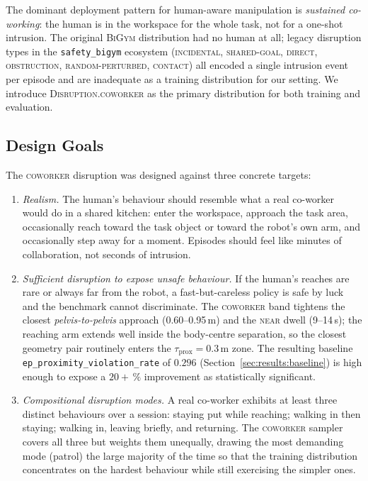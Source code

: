 \documentclass[11pt,a4paper]{report}
\newcommand{\bigym}{\textsc{BiGym}}
\newcommand{\sbigym}{\texttt{safety\_bigym}}
\newcommand{\coworker}{\textsc{coworker}}
\begin{document}
The dominant deployment pattern for human-aware manipulation is
\emph{sustained co-working}: the human is in the workspace for the
whole task, not for a one-shot intrusion. The original \bigym{}
distribution had no human at all; legacy disruption types in the
\sbigym{} ecosystem (\textsc{incidental}, \textsc{shared-goal},
\textsc{direct}, \textsc{obstruction}, \textsc{random-perturbed},
\textsc{contact}) all encoded a single intrusion event per episode
and are inadequate as a training distribution for our setting. We
introduce \textsc{Disruption.coworker} as the primary distribution
for both training and evaluation.

\subsection{Design Goals}
\label{sec:bench:coworker:design}

The \coworker{} disruption was designed against three concrete
targets:

\begin{enumerate}[topsep=2pt,itemsep=2pt]
\item \emph{Realism.} The human's behaviour should resemble what a
  real co-worker would do in a shared kitchen: enter the workspace,
  approach the task area, occasionally reach toward the task object
  or toward the robot's own arm, and occasionally step
  away for a moment. Episodes should feel like minutes of
  collaboration, not seconds of intrusion.
\item \emph{Sufficient disruption to expose unsafe behaviour.} If
  the human's reaches are rare or always far from the robot, a
  fast-but-careless policy is safe by luck and the benchmark cannot
  discriminate. The \coworker{} band tightens the closest
  \emph{pelvis-to-pelvis} approach (0.60--0.95\,m) and the
  \textsc{near} dwell (9--14\,s); the reaching arm extends well
  inside the body-centre separation, so the closest geometry pair
  routinely enters the $\tau_{\mathrm{prox}} = 0.3$\,m zone. The
  resulting baseline
  \texttt{ep\_proximity\_violation\_rate} of $0.296$
  (Section~\ref{sec:results:baseline}) is high enough to expose a
  $20+\,\%$ improvement as statistically significant.
\item \emph{Compositional disruption modes.} A real co-worker
  exhibits at least three distinct behaviours over a session:
  staying put while reaching; walking in then staying; walking in,
  leaving briefly, and returning. The \coworker{} sampler covers all
  three but weights them unequally, drawing the most demanding mode
  (patrol) the large majority of the time so that the training
  distribution concentrates on the hardest behaviour while still
  exercising the simpler ones.
\end{enumerate}
\end{document}
